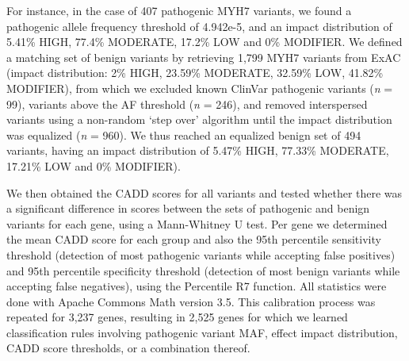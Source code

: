 For instance, in the case of 407 pathogenic MYH7 variants, we found a pathogenic allele frequency threshold of 4.942e-5, and an impact distribution of 5.41\% HIGH, 77.4\% MODERATE, 17.2\% LOW and 0\% MODIFIER.
We defined a matching set of benign variants by retrieving 1,799 MYH7 variants from ExAC (impact distribution: 2\% HIGH, 23.59\% MODERATE, 32.59\% LOW, 41.82\% MODIFIER), from which we excluded known ClinVar pathogenic variants (\textsl{n} = 99), variants above the AF threshold (\textsl{n} = 246), and removed interspersed variants using a non-random ‘step over’ algorithm until the impact distribution was equalized (\textsl{n} = 960).
We thus reached an equalized benign set of 494 variants, having an impact distribution of 5.47\% HIGH, 77.33\% MODERATE, 17.21\% LOW and 0\% MODIFIER).

We then obtained the CADD scores for all variants and tested whether there was a significant difference in scores between the sets of pathogenic and benign variants for each gene, using a Mann-Whitney U test.
Per gene we determined the mean CADD score for each group and also the 95th percentile sensitivity threshold (detection of most pathogenic variants while accepting false positives) and 95th percentile specificity threshold (detection of most benign variants while accepting false negatives), using the Percentile R7 function.
All statistics were done with Apache Commons Math version 3.5.
This calibration process was repeated for 3,237 genes, resulting in 2,525 genes for which we learned classification rules involving pathogenic variant MAF, effect impact distribution, CADD score thresholds, or a combination thereof.

